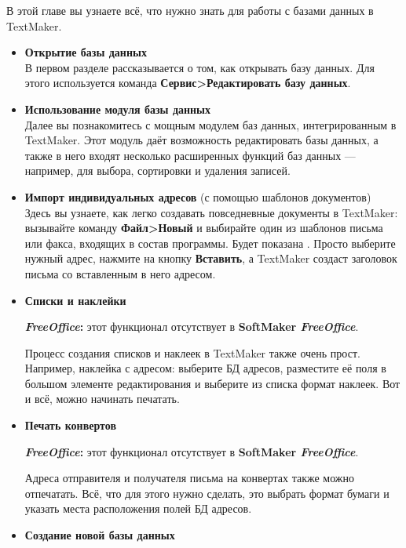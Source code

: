 ﻿\documentclass[a4paper,10pt]{article}
\begin{document}
В этой главе вы узнаете всё, что нужно знать для работы с базами данных в TextMaker.

\begin{itemize}
 \item \textbf{Открытие базы данных}\\
 В первом разделе рассказывается о том, как открывать базу данных. Для этого используется команда \textbf{Сервис>Редактировать базу данных}.
 \item \textbf{Использование модуля базы данных}\\
 Далее вы познакомитесь с мощным модулем баз данных, интегрированным в TextMaker. Этот модуль даёт возможность редактировать базы данных, а также в него входят несколько расширенных функций баз данных — например, для выбора, сортировки и удаления записей.
 \item \textbf{Импорт индивидуальных адресов} (с помощью шаблонов документов)\\
 Здесь вы узнаете, как легко создавать повседневные документы в TextMaker: вызывайте команду \textbf{Файл>Новый} и выбирайте один из шаблонов письма или факса, входящих в состав программы. Будет показана . Просто выберите нужный адрес, нажмите на кнопку \textbf{Вставить}, а TextMaker создаст заголовок письма со вставленным в него адресом.
 \item \textbf{Списки и наклейки}\\
 \begin{mdframed}[backgroundcolor=pink!50]
\textbf{\textit{FreeOffice}:} этот функционал отсутствует в \textbf{SoftMaker \textit{FreeOffice}}.
\end{mdframed}
Процесс создания списков и наклеек в TextMaker также очень прост. Например, наклейка с адресом: выберите БД адресов, разместите её поля в большом элементе редактирования и выберите из списка формат наклеек. Вот и всё, можно начинать печатать.
\item \textbf{Печать конвертов}\\
 \begin{mdframed}[backgroundcolor=pink!50]
\textbf{\textit{FreeOffice}:} этот функционал отсутствует в \textbf{SoftMaker \textit{FreeOffice}}.
\end{mdframed}
Адреса отправителя и получателя письма на конвертах также можно отпечатать. Всё, что для этого нужно сделать, это выбрать формат бумаги и указать места расположения полей БД адресов.
\item \textbf{Создание новой базы данных}\\

\end{itemize}
\end{document}

